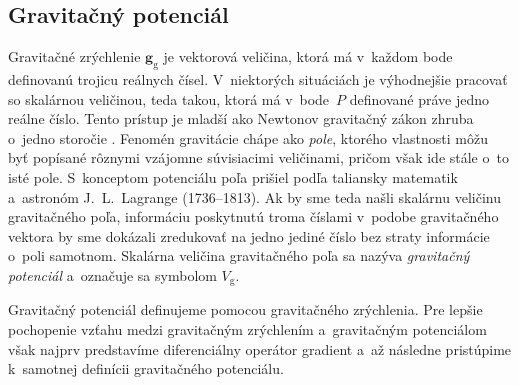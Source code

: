 \documentclass[a4paper,12pt]{book}
\newcommand{\gidx}{\mathrm g}
\let\vec\mathbf
\begin{document}
\subsection{Gravitačný potenciál}
\label{sec:vg}

Gravitačné zrýchlenie $\vec g_\gidx$ je vektorová veličina, ktorá má v~každom 
bode definovanú trojicu reálnych čísel.  V~niektorých situáciách je výhodnejšie 
pracovať so skalárnou veličinou, teda takou, ktorá má v~bode~$P$ definované 
práve jedno reálne číslo.  Tento prístup je mladší ako Newtonov gravitačný 
zákon zhruba o~jedno storočie \parencite{MacMillan1930,Jekeli2015}.  Fenomén 
gravitácie chápe ako \emph{pole}, ktorého vlastnosti môžu byť popísané rôznymi 
vzájomne súvisiacimi veličinami, pričom však ide stále o~to isté pole.  
S~konceptom potenciálu poľa prišiel podľa \textcite{MacMillan1930} taliansky 
matematik a~astronóm J.~L.~Lagrange (1736--1813).  Ak by sme teda našli 
skalárnu veličinu gravitačného poľa, informáciu poskytnutú troma číslami 
v~podobe gravitačného vektora by sme dokázali zredukovať na jedno jediné číslo 
bez straty informácie o~poli samotnom.  Skalárna veličina gravitačného poľa sa 
nazýva \emph{gravitačný potenciál} a~označuje sa symbolom $V_\gidx$.

Gravitačný potenciál definujeme pomocou gravitačného zrýchlenia.  Pre lepšie
pochopenie vzťahu medzi gravitačným zrýchlením a~gravitačným potenciálom však
najprv predstavíme diferenciálny operátor gradient a~až následne pristúpime
k~samotnej definícii gravitačného potenciálu.
\end{document}
